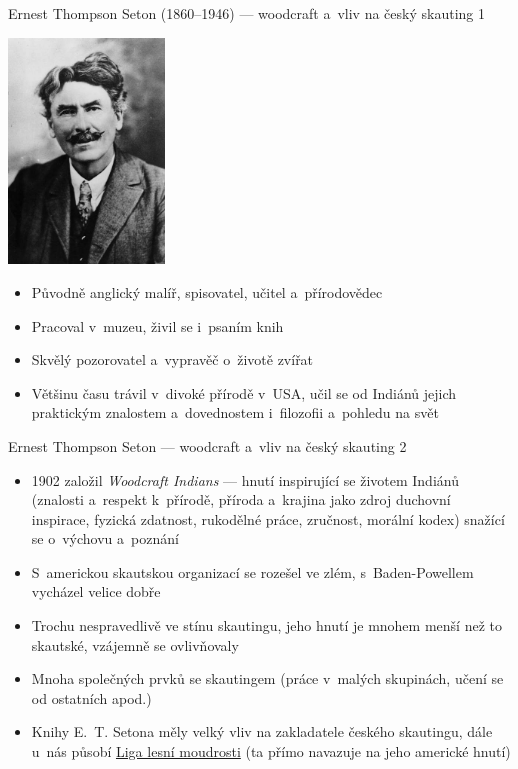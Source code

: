 \documentclass[hyperref={bookmarks=true, unicode=true, colorlinks=true, plainpages=false, pdfkeywords={Skaut, Junak, Skauting, Vychovna metoda}, linkcolor=OrangeRed, anchorcolor=OrangeRed, citecolor=RawSienna, filecolor=RawSienna, menucolor=OrangeRed, urlcolor=RawSienna, pdftex}, compress, xelatex, xcolor=dvipsnames, print]{beamer}
\begin{document}
\begin{frame}{Ernest Thompson Seton (1860--1946) --- woodcraft a~vliv na český skauting 1}
\begin{multicols}{2}
  \begin{center}
    \includegraphics[height=6cm]{seton.jpg}
  \end{center}
\columnbreak
\begin{itemize}
 \item Původně anglický malíř, spisovatel, učitel a~přírodovědec
 \item Pracoval v~muzeu, živil se i~psaním knih
 \item Skvělý pozorovatel a~vypravěč o~životě zvířat
 \item Většinu času trávil v~divoké přírodě v~USA, učil se od Indiánů jejich praktickým znalostem a~dovednostem i~filozofii a~pohledu na svět
\end{itemize}
\end{multicols}
\end{frame}

\begin{frame}{Ernest Thompson Seton --- woodcraft a~vliv na český skauting 2}
\begin{itemize}
 \item 1902 založil \textit{Woodcraft Indians} --- hnutí inspirující se životem Indiánů (znalosti a~respekt k~přírodě, příroda a~krajina jako zdroj duchovní inspirace, fyzická zdatnost, rukodělné práce, zručnost, morální kodex) snažící se o~výchovu a~poznání
 \item S~americkou skautskou organizací se rozešel ve zlém, s~Baden-Powellem vycházel velice dobře
 \item Trochu nespravedlivě ve stínu skautingu, jeho hnutí je mnohem menší než to skautské, vzájemně se ovlivňovaly
 \item Mnoha společných prvků se skautingem (práce v~malých skupinách, učení se od ostatních apod.)
 \item Knihy E.~T. Setona měly velký vliv na zakladatele českého skautingu, dále u~nás působí \href{http://www.woodcraft.cz/}{Liga lesní moudrosti} (ta přímo navazuje na jeho americké hnutí)
\end{itemize}
\end{frame}
\end{document}
